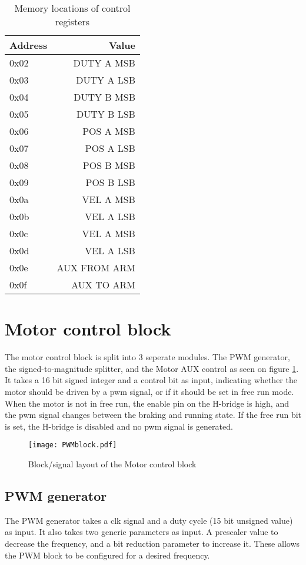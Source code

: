 \begin{table}[htb]
\centering
\begin{tabular}{|l|r|}
\hline
Address & Value \\
\hline
0x02 & DUTY A MSB \\
0x03 & DUTY A LSB\\
0x04 & DUTY B MSB\\
0x05 & DUTY B LSB\\
0x06 & POS A MSB\\
0x07 & POS A LSB\\
0x08 & POS B MSB\\
0x09 & POS B LSB\\
0x0a & VEL A MSB\\
0x0b & VEL A LSB\\
0x0c & VEL A MSB\\
0x0d & VEL A LSB\\
0x0e & AUX FROM ARM\\
0x0f & AUX TO ARM\\
\hline 
\end{tabular}
\caption{Memory locations of control registers}
\label{tab:Memorymapping}
\end{table}


\section{Motor control block}


The motor control block is split into 3 seperate modules.
The PWM generator, the signed-to-magnitude splitter, and the Motor AUX control as seen on figure \ref{fig:pwmblock}.
It takes a 16 bit signed integer and a control bit as input, indicating whether the motor should be driven by a pwm signal, or if it should be set in free run mode. 
When the motor is not in free run, the enable pin on the H-bridge is high, and the pwm signal changes between the braking and running state. If the free run bit is set, the H-bridge is disabled and no pwm signal is generated.

\begin{figure}[htb]
\centering
\texttt{[image: PWMblock.pdf]}
\caption{Block/signal layout of the Motor control block}
\label{fig:pwmblock}
\end{figure}

\subsection{PWM generator}
The PWM generator takes a clk signal and a duty cycle (15 bit unsigned value) as input. It also takes two generic parameters as input. A prescaler value to decrease the frequency, and a bit reduction parameter to increase it. These allows the PWM block to be configured for a desired frequency.

